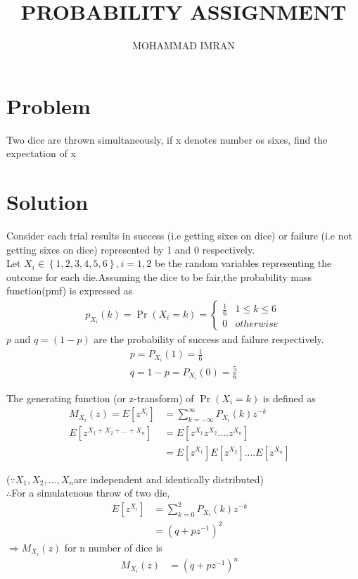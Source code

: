 \documentclass[a4paper,10pt,two column]{article}
\title{PROBABILITY ASSIGNMENT}
\author{MOHAMMAD IMRAN}
\providecommand{\cbrak}[1]{\ensuremath{\left\{#1\right\}}}
\providecommand{\sbrak}[1]{\ensuremath{{}\left[#1\right]}}
\providecommand{\pr}[1]{\ensuremath{\Pr\left(#1\right)}}
\begin{document}
\maketitle
\bigskip


\section{\textbf{Problem }}
Two dice are thrown simultaneously, if x denotes number os sixes, find the expectation of x


\section{\textbf{Solution }}
Consider each trial results in success (i.e getting sixes on dice) or failure (i.e not getting sixes on dice) represented by 1 and 0 respectively.
\\

Let $X_i \in \cbrak{1,2,3,4,5,6} , i = 1,2$ be the random variables representing the outcome for each die.Assuming the dice to be fair,the probability mass function(pmf) is expressed as
\\
\begin{align}
 p_{X_i}(k) = \Pr(X_i=k) =
\begin{cases}
\frac{1}{6} & 1 \leq k \leq 6 \\
0 & otherwise
\end{cases} 
\end{align}
$p$ and $q = (1 - p)$ are the probability of success and failure respectively.
\begin{align}
& p = P_{X_i}(1) = \frac{1}{6}&               \label{eq:1}
\\            
& q = 1 - p = P_{X_i}(0) = \frac{5}{6}&       \label{eq:2}
\end{align}



The generating function (or z-transform) of $\pr{X_i =k}$  is defined as 
\\
\begin{align}
M_{X_i}(z) = E\sbrak{z^{X_i}} &= \sum_{k=-\infty}^{\infty} P_{X_i}(k)z^{-k}&
\\
E\sbrak{z^{X_1+X_2+...+X_n}}&= E\sbrak{z^{X_1}z^{X_2}....z^{X_n}}& \nonumber
\\
&= E\sbrak{z^{X_1}}E\sbrak{z^{X_2}}....E\sbrak{z^{X_n}}&
\end{align} 

($\because X_1,X_2,...,X_n$are independent and identically distributed)
\\
$\therefore$For a simulatenous throw of two die,
\begin{align}
E\sbrak{z^{X_i}}& = \sum_{k=0}^{2} P_{X_i}(k) z^{-k}&
\\
&= (q+pz^{-1})^{2}&
\end{align}
$\Rightarrow M_{X_i}(z)$ for n number of dice is
\begin{align}
 M_{X_i}(z)&= (q + pz^{-1})^n&
\end{align}
\end{document}
